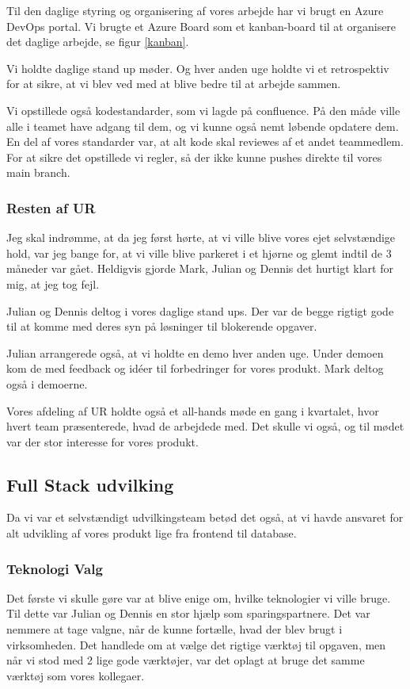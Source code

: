 \documentclass[a4paper]{article}
\begin{document}
Til den daglige styring og organisering af vores arbejde
har vi brugt en Azure DevOps portal.
Vi brugte et Azure Board som et kanban-board
til at organisere det daglige arbejde, se figur \ref{kanban}.

Vi holdte daglige stand up møder.
Og hver anden uge holdte vi et retrospektiv for at sikre,
at vi blev ved med at blive bedre til at arbejde sammen.

Vi opstillede også kodestandarder, som vi lagde på confluence.
På den måde ville alle i teamet have adgang til dem,
og vi kunne også nemt løbende opdatere dem.
En del af vores standarder var,
at alt kode skal reviewes af et andet teammedlem.
For at sikre det opstillede vi regler,
så der ikke kunne pushes direkte til vores main branch.

\subsubsection{Resten af UR}
Jeg skal indrømme, at da jeg først hørte,
at vi ville blive vores ejet selvstændige hold,
var jeg bange for,
at vi ville blive parkeret i et hjørne og glemt indtil de 3 måneder var gået.
Heldigvis gjorde Mark, Julian og Dennis det hurtigt klart for mig,
at jeg tog fejl.

Julian og Dennis deltog i vores daglige stand ups.
Der var de begge rigtigt gode til at komme med deres syn på løsninger til blokerende opgaver.

Julian arrangerede også, at vi holdte en demo hver anden uge.
Under demoen kom de med feedback og idéer til forbedringer for vores produkt.
Mark deltog også i demoerne.

Vores afdeling af UR holdte også et all-hands møde en gang i kvartalet,
hvor hvert team præsenterede, hvad de arbejdede med.
Det skulle vi også,
og til mødet var der stor interesse for vores produkt.

\subsection{Full Stack udvilking}
Da vi var et selvstændigt udvilkingsteam betød det også,
at vi havde ansvaret for alt udvikling af vores produkt
lige fra frontend til database.

\subsubsection{Teknologi Valg}
Det første vi skulle gøre var at blive enige om,
hvilke teknologier vi ville bruge.
Til dette var Julian og Dennis en stor hjælp som sparingspartnere.
Det var nemmere at tage valgne,
når de kunne fortælle,
hvad der blev brugt i virksomheden.
Det handlede om at vælge det rigtige værktøj til opgaven,
men når vi stod med 2 lige gode værktøjer,
var det oplagt at bruge det samme værktøj som vores kollegaer.
\end{document}
